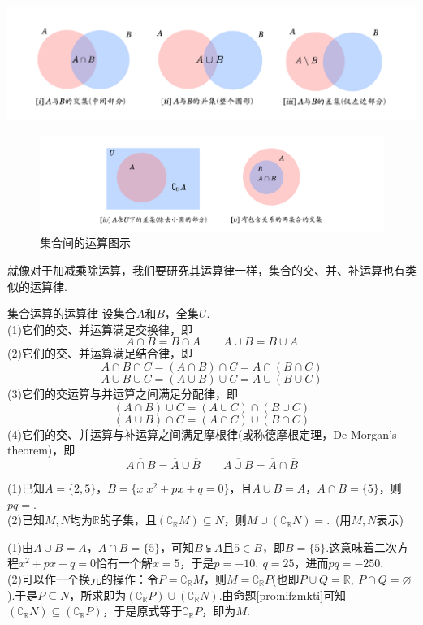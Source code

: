 \documentclass[lang=cn, zihao=5]{elegantbook}
\newcommand{\R}{\mathbb{R}}
\newcommand{\tk}{\uline{\hspace{4em}}}
\begin{document}
\begin{center}
	\includegraphics{attachment/20230318jihe.pdf}
\end{center}
\begin{figure}[H]
	\centering
	\includegraphics{attachment/20230318jihe2.pdf}
	\caption{集合间的运算图示}
\end{figure}

就像对于加减乘除运算，我们要研究其运算律一样，集合的交、并、补运算也有类似的运算律.

\begin{proposition}{集合运算的运算律}
	设集合$A$和$B$，全集$U$. \\
	(1)它们的交、并运算满足交换律，即$$A \cap B = B \cap A \qquad A \cup B = B \cup A$$
	(2)它们的交、并运算满足结合律，即
	$$A \cap B \cap C = (A \cap B) \cap C = A \cap (B \cap C)$$
	$$A \cup B \cup C = (A \cup B) \cup C = A \cup (B \cup C)$$
	(3)它们的交运算与并运算之间满足分配律，即
	$$(A \cap B) \cup C = (A \cup C) \cap (B \cup C)$$
	$$(A \cup B) \cap C = (A \cap C) \cup (B \cap C)$$
	(4)它们的交、并运算与补运算之间满足摩根律(或称德摩根定理，De Morgan's theorem)，即$$\overline{A \cap B} = \overline{A} \cup \overline{B} \qquad \overline{A \cup B} = \overline{A} \cap \overline{B}$$
\end{proposition}

\begin{example}
	(1)已知$A=\{ 2,5 \}$，$B = \{ x|x^2+px+q=0 \}$，且$A \cup B = A$，$A \cap B = \{ 5 \}$，则$pq=$\tk . \\
	(2)已知$M,N$均为$\mathbb{R}$的子集，且$(\complement _{\mathbb{R}} M) \subseteq N$，则$M \cup (\complement _{\mathbb{R}} N)=$\tk .~(用$M,N$表示) \\
\end{example}
\begin{solution}
	(1)由$A \cup B = A$，$A \cap B = \{ 5 \}$，可知$B \subsetneqq A$且$5 \in B$，即$B=\{ 5 \}$.这意味着二次方程$x^2+px+q=0$恰有一个解$x=5$，于是$p=-10,~q=25$，进而$pq=-250$. \\
	(2)可以作一个换元的操作：令$P=\complement _{\mathbb{R}} M$，则$M=\complement _{\mathbb{R}} P$(也即$P \cup Q=\R ,~P \cap Q = \varnothing$).于是$P \subseteq N$，所求即为$(\complement _{\mathbb{R}} P) \cup (\complement _{\mathbb{R}} N)$.由命题\ref{pro:nifzmkti}可知$(\complement _{\mathbb{R}} N) \subseteq (\complement _{\mathbb{R}} P)$，于是原式等于$\complement _{\mathbb{R}} P$，即为$M$.
\end{solution}
\end{document}
